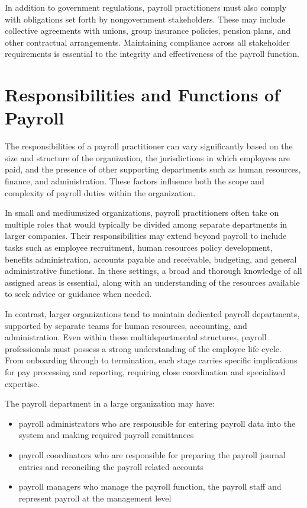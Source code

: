 \documentclass[letterpaper,10pt,english]{sphinxmanual}
\begin{document}
\sphinxAtStartPar
In addition to government regulations, payroll practitioners must also comply with obligations set forth by non\sphinxhyphen{}government
stakeholders. These may include collective agreements with unions, group insurance policies, pension plans, and other
contractual arrangements. Maintaining compliance across all stakeholder requirements is essential to the integrity and
effectiveness of the payroll function.


\section{Responsibilities and Functions of Payroll}
\label{\detokenize{compliance:responsibilities-and-functions-of-payroll}}
\sphinxAtStartPar
The responsibilities of a payroll practitioner can vary significantly based on the size and structure of the organization,
the jurisdictions in which employees are paid, and the presence of other supporting departments such as human resources,
finance, and administration. These factors influence both the scope and complexity of payroll duties within the organization.

\sphinxAtStartPar
In small and medium\sphinxhyphen{}sized organizations, payroll practitioners often take on multiple roles that would typically be divided
among separate departments in larger companies. Their responsibilities may extend beyond payroll to include tasks such as
employee recruitment, human resources policy development, benefits administration, accounts payable and receivable, budgeting,
and general administrative functions. In these settings, a broad and thorough knowledge of all assigned areas is essential,
along with an understanding of the resources available to seek advice or guidance when needed.

\sphinxAtStartPar
In contrast, larger organizations tend to maintain dedicated payroll departments, supported by separate teams for human
resources, accounting, and administration. Even within these multi\sphinxhyphen{}departmental structures, payroll professionals must possess
a strong understanding of the employee life cycle. From onboarding through to termination, each stage carries specific
implications for pay processing and reporting, requiring close coordination and specialized expertise.

\sphinxAtStartPar
The payroll department in a large organization may have:
\begin{itemize}
\item {} 
\sphinxAtStartPar
payroll administrators who are responsible for entering payroll data into the system and making required payroll remittances

\item {} 
\sphinxAtStartPar
payroll coordinators who are responsible for preparing the payroll journal entries and reconciling the payroll related accounts

\item {} 
\sphinxAtStartPar
payroll managers who manage the payroll function, the payroll staff and represent payroll at the management level

\end{itemize}
\end{document}
